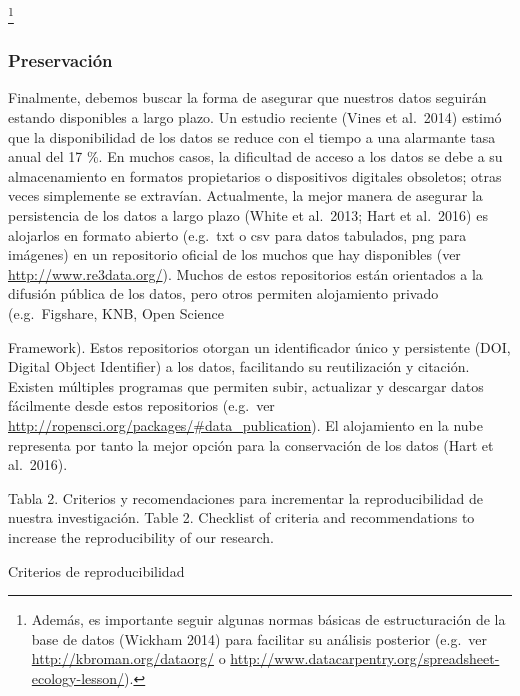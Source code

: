 \documentclass[]{tufte-handout}
\begin{document}
\footnote{Además, es importante seguir algunas normas básicas de
  estructuración de la base de datos (Wickham 2014) para facilitar su
  análisis posterior (e.g.~ver \url{http://kbroman.org/dataorg/} o
  \url{http://www.datacarpentry.org/spreadsheet-ecology-lesson/}).}

\hypertarget{preservaciuxf3n}{%
\subsubsection{Preservación}\label{preservaciuxf3n}}

Finalmente, debemos buscar la forma de asegurar que nuestros datos
seguirán estando disponibles a largo plazo. Un estudio reciente (Vines
et al.~2014) estimó que la disponibilidad de los datos se reduce con el
tiempo a una alarmante tasa anual del 17 \%. En muchos casos, la
dificultad de acceso a los datos se debe a su almacenamiento en formatos
propietarios o dispositivos digitales obsoletos; otras veces simplemente
se extravían. Actualmente, la mejor manera de asegurar la persistencia
de los datos a largo plazo (White et al.~2013; Hart et al.~2016) es
alojarlos en formato abierto (e.g.~txt o csv para datos tabulados, png
para imágenes) en un repositorio oficial de los muchos que hay
disponibles (ver \url{http://www.re3data.org/}). Muchos de estos
repositorios están orientados a la difusión pública de los datos, pero
otros permiten alojamiento privado (e.g.~Figshare, KNB, Open Science

Framework). Estos repositorios otorgan un identificador único y
persistente (DOI, Digital Object Identifier) a los datos, facilitando su
reutilización y citación. Existen múltiples programas que permiten
subir, actualizar y descargar datos fácilmente desde estos repositorios
(e.g.~ver \url{http://ropensci.org/packages/\#data_publication}). El
alojamiento en la nube representa por tanto la mejor opción para la
conservación de los datos (Hart et al.~2016).

Tabla 2. Criterios y recomendaciones para incrementar la
reproducibilidad de nuestra investigación. Table 2. Checklist of
criteria and recommendations to increase the reproducibility of our
research.

Criterios de reproducibilidad
\end{document}
